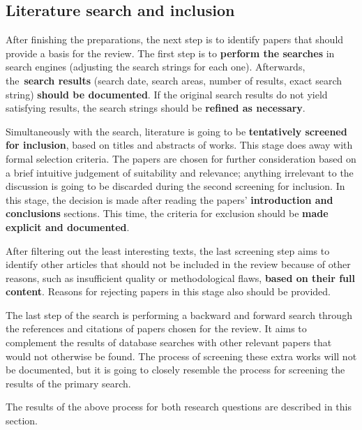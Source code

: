 \subsection{Literature search and inclusion}\label{subsec:literature-search-inclusion}

After finishing the preparations, the next step is to identify papers that should provide a basis for the review.
The first step is to \textbf{perform the searches} in search engines (adjusting the search strings for each one).
Afterwards, the\ \textbf{search results} (search date, search areas, number of results, exact search string) \textbf{should be documented}.
If the original search results do not yield satisfying results, the search strings should be \textbf{refined as necessary}.

Simultaneously with the search, literature is going to be \textbf{tentatively screened for inclusion}, based on titles and abstracts of works.
This stage does away with formal selection criteria.
The papers are chosen for further consideration based on a brief intuitive judgement of suitability and relevance;
anything irrelevant to the discussion is going to be discarded during the second screening for inclusion.
In this stage, the decision is made after reading the papers' \textbf{introduction and conclusions} sections.
This time, the criteria for exclusion should be \textbf{made explicit and documented}.

After filtering out the least interesting texts, the last screening step aims to identify other articles
that should not be included in the review because of other reasons, such as insufficient quality or methodological flaws,
\textbf{based on their full content}.
Reasons for rejecting papers in this stage also should be provided.

The last step of the search is performing a backward and forward search through the references and citations of papers chosen for the review.
It aims to complement the results of database searches with other relevant papers that would not otherwise be found.
The process of screening these extra works will not be documented, but it is going to closely resemble the process for screening the results of the primary search.

The results of the above process for both research questions are described in this section.




